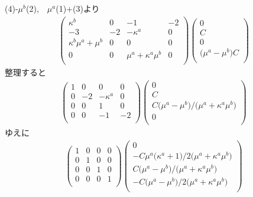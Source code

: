 \documentclass[titlepage,a4paper,12pt,oneside,dvipdfmx]{jsbook}
\begin{document}
(4)-$\mu^b$(2),　$\mu^a$(1)+(3)より
\begin{align}
	\left(
	\begin{array}{cccc}
		\kappa^b & 0 & -1 & -2 \\
		-3 & -2 & -\kappa^a & 0 \\
		\kappa^b\mu^{a}+\mu^{b} & 0 & 0 & 0 \\
		0 & 0 & \mu^{a}+\kappa^{a}\mu^{b} & 0 \\
	\end{array}
	\right)
	\left(
	\begin{array}{c}
		0 \\
	 	C \\
		0 \\
	 	\bigl(\mu^{a}-\mu^{b}\bigr)C \\
	\end{array}
	\right)
\end{align}
整理すると
\begin{align}
	\left(
	\begin{array}{cccc}
		1 & 0 & 0 & 0 \\
		0 & -2 & -\kappa^a & 0 \\
		0 & 0 & 1 & 0 \\
		0 & 0 & -1 & -2 \\
	\end{array}
	\right)
	\left(
	\begin{array}{c}
		0 \\
	 	C \\
		C\bigl(\mu^{a}-\mu^{b}\bigr)/\bigl(\mu^{a}+\kappa^{a}\mu^{b}\bigr) \\
	 	0 \\
	\end{array}
	\right)
\end{align}
ゆえに
\begin{align}
	\left(
	\begin{array}{cccc}
		1 & 0 & 0 & 0 \\
		0 & 1 & 0 & 0 \\
		0 & 0 & 1 & 0 \\
		0 & 0 & 0 & 1 \\
	\end{array}
	\right)
	\left(
	\begin{array}{c}
		0 \\
	 	-C\mu^{a}\bigl(\kappa^{a}+1\bigr)/2\bigl(\mu^{a}+\kappa^{a}\mu^{b}\bigr) \\
		C\bigl(\mu^{a}-\mu^{b}\bigr)/\bigl(\mu^{a}+\kappa^{a}\mu^{b}\bigr) \\
	 	-C\bigl(\mu^{a}-\mu^{b}\bigr)/2\bigl(\mu^{a}+\kappa^{a}\mu^{b}\bigr) \\
	\end{array}
	\right)
\end{align}
\end{document}
